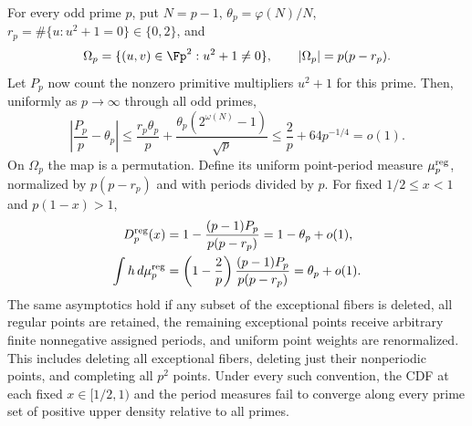\begin{proposition}\label{prop:allodd}
For every odd prime $p$, put $N=p-1$, $\theta_p=\varphi(N)/N$,
$r_p=\#\{u:u^2+1=0\}\in\{0,2\}$, and
\[
 \Omega_p=\{(u,v)\in\Fp^2:u^2+1\ne0\},\qquad
 |\Omega_p|=p(p-r_p).
\]
Let $P_p$ now count the nonzero primitive multipliers $u^2+1$ for this
prime. Then, uniformly as $p\to\infty$ through all odd primes,
\begin{equation}\label{eq:allprimitive}
 \left|\frac{P_p}{p}-\theta_p\right|
 \le\frac{r_p\theta_p}{p}
    +\frac{\theta_p(2^{\omega(N)}-1)}{\sqrt p}
 \le\frac2p+64p^{-1/4}=o(1).
\end{equation}
On $\Omega_p$ the map is a permutation. Define its uniform point-period
measure $\mu_p^{\rm reg}$, normalized by $p(p-r_p)$ and with periods
divided by $p$. For fixed $1/2\le x<1$ and $p(1-x)>1$,
\begin{align}
 D_p^{\rm reg}(x)
 &=1-\frac{(p-1)P_p}{p(p-r_p)}=1-\theta_p+o(1),\label{eq:allcdf}\\
 \int h\,d\mu_p^{\rm reg}
 &=\left(1-\frac2p\right)\frac{(p-1)P_p}{p(p-r_p)}
   =\theta_p+o(1).\label{eq:allmoment}
\end{align}
The same asymptotics hold if any subset of the exceptional fibers is
deleted, all regular points are retained, the remaining exceptional
points receive arbitrary finite nonnegative assigned periods, and
uniform point weights are renormalized. This includes deleting all
exceptional fibers, deleting just their nonperiodic points, and completing
all $p^2$ points. Under every such convention, the CDF at each fixed
$x\in[1/2,1)$ and the period measures fail to converge along every prime
set of positive upper density relative to all primes.
\end{proposition}
